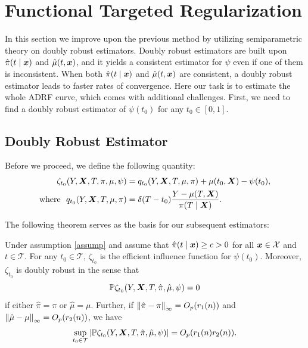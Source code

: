\section{Functional Targeted Regularization}\label{sec:targeted_regularization}
In this section we improve upon the previous method by utilizing semiparametric theory on doubly robust estimators. Doubly robust estimators are built upon $\hat\pi(t\mid\boldsymbol{x})$ and $\hat \mu(t,\boldsymbol{x})$, and it yields a consistent estimator for $\psi$ even if one of them is inconsistent. When both $\hat\pi(t\mid\boldsymbol{x})$ and $\hat \mu(t,\boldsymbol{x})$ are consistent, a doubly robust estimator leads to faster rates of convergence.
Here our task is to estimate the whole ADRF curve, which comes with additional challenges. First, we need to find a doubly robust estimator of $\psi(t_0)$ for any $t_0\in[0,1]$.

\subsection{Doubly Robust Estimator}
Before we proceed, we define the following quantity:
\begin{align*}
\zeta_{t_{0}}(Y,\boldsymbol{X},T,\pi,\mu,\psi) & =q_{t_{0}}(Y,\boldsymbol{X},T,\mu,\pi)+\mu(t_{0},\boldsymbol{X})-\psi(t_{0}),\\
\text{where}\ \ q_{t_{0}}(Y,\boldsymbol{X},T,\mu,\pi) & =\delta(T-t_{0})\frac{Y-\mu(T,\boldsymbol{X})}{\pi(T\mid\boldsymbol{X})}.
\end{align*}

The following theorem serves as the basis for our subsequent estimators:
\begin{thm}\label{thm:doubly_robust}
Under assumption \ref{assump} and assume that $\hat{\pi}(t\mid \boldsymbol{x})\ge c>0$ for all $\boldsymbol{x}\in\mathcal{X}$ and $t\in\mathcal{T}$.
For any $t_0\in\mathcal{T}$, $\zeta_{t_{0}}$ is the efficient influence function for $\psi(t_0)$.
Moreover, $\zeta_{t_0}$ is doubly robust in the sense that 
\[
    \mathbb{P}\zeta_{t_0}(Y,\boldsymbol{X},T,\hat{\pi},\hat{\mu},\psi)=0
\]
if either $\hat{\pi}=\pi$ or $\hat{\mu}=\mu$. 
Further, if $\left\Vert \hat{\pi}-\pi\right\Vert _{\infty}=O_{p}(r_1(n))$ and $\left\Vert \hat{\mu}-\mu\right\Vert _{\infty}=O_{p}(r_2(n))$, we have 
\[
\sup_{t_{0}\in\mathcal{T}}\left|\mathbb{P}\zeta_{t_0}(Y,\boldsymbol{X},T,\hat{\pi},\hat{\mu},\psi)\right|=O_p(r_1(n)r_2(n)).
\]
\end{thm}

